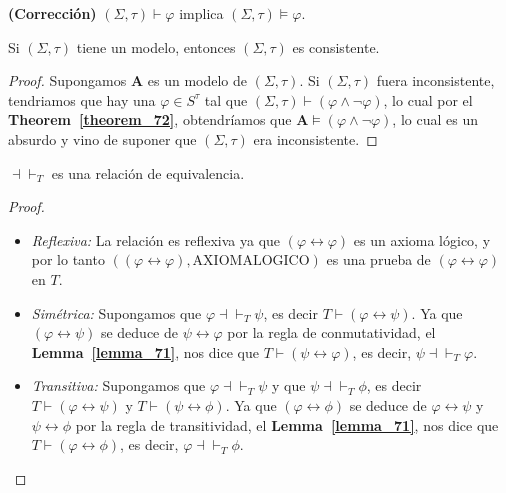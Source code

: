   \begin{theorem} \label{theorem_72}
    \PN \textbf{(Corrección)} $(\Sigma, \tau) \vdash \varphi$ implica $(\Sigma, \tau) \models \varphi$.
  \end{theorem}

  \begin{corollary} \label{corollary_73}
    \PN Si $(\Sigma, \tau)$ tiene un modelo, entonces $(\Sigma, \tau)$ es consistente.
  \end{corollary}
  \begin{proof}
    \PN Supongamos $\mathbf{A}$ es un modelo de $(\Sigma, \tau)$. Si $(\Sigma, \tau)$ fuera inconsistente, tendriamos
    que hay una $\varphi \in S^{\tau}$ tal que $(\Sigma, \tau) \vdash (\varphi \wedge \lnot \varphi)$, lo cual por
    el \textbf{Theorem~\ref{theorem_72}}, obtendríamos que $\mathbf{A} \models (\varphi \wedge \lnot \varphi)$, lo cual
    es un absurdo y vino de suponer que $(\Sigma, \tau)$ era inconsistente.
  \end{proof}

  \begin{lemma} \label{lemma_74}
    \PN $\dashv \vdash_{T}$ es una relación de equivalencia.
  \end{lemma}
  \begin{proof}
    \PN \newline
    \begin{itemize}
      \item \textit{Reflexiva:} La relación es reflexiva ya que $(\varphi \leftrightarrow \varphi)$ es un axioma
        lógico, y por lo tanto $((\varphi \leftrightarrow \varphi), \text{AXIOMALOGICO})$ es una prueba de $(\varphi
        \leftrightarrow \varphi)$ en $T$.
      \item \textit{Simétrica:} Supongamos que $\varphi \dashv \vdash_{T} \psi$, es decir $T \vdash (\varphi
        \leftrightarrow \psi)$. Ya que $(\varphi \leftrightarrow \psi)$ se deduce de $\psi \leftrightarrow \varphi$ por
        la regla de conmutatividad, el \textbf{Lemma~\ref{lemma_71}}, nos dice que $T \vdash (\psi \leftrightarrow
        \varphi)$, es decir, $\psi \dashv \vdash_{T} \varphi$.
      \item \textit{Transitiva:} Supongamos que $\varphi \dashv \vdash_{T} \psi$ y que $\psi \dashv \vdash_{T} \phi$, es
        decir $T \vdash (\varphi \leftrightarrow \psi)$ y $T \vdash (\psi \leftrightarrow \phi)$. Ya que $(\varphi
        \leftrightarrow \phi)$ se deduce de $\varphi \leftrightarrow \psi$ y $\psi \leftrightarrow \phi$ por
        la regla de transitividad, el \textbf{Lemma~\ref{lemma_71}}, nos dice que $T \vdash (\varphi \leftrightarrow
        \phi)$, es decir, $\varphi \dashv \vdash_{T} \phi$.
    \end{itemize}
  \end{proof}

